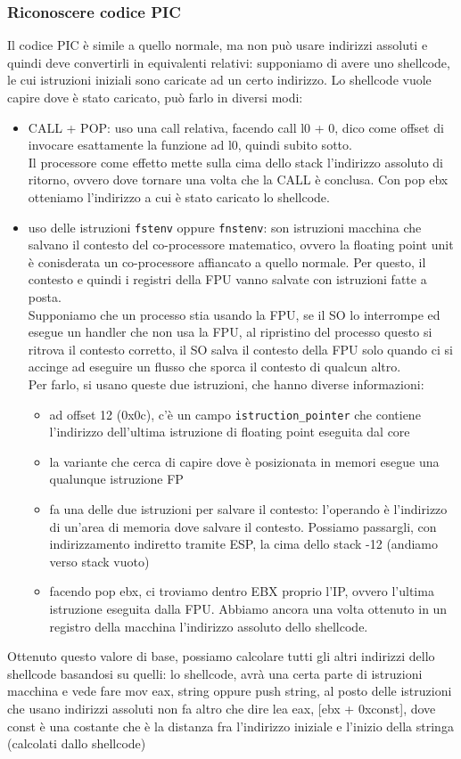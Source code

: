 \documentclass[12pt, oneside]{extbook}
\begin{document}
\subsubsection{Riconoscere codice PIC}
Il codice PIC è simile a quello normale, ma non può usare indirizzi assoluti e quindi deve convertirli in equivalenti relativi: supponiamo di avere uno shellcode, le cui istruzioni iniziali sono caricate ad un certo indirizzo. Lo shellcode vuole capire dove è stato caricato, può farlo in diversi modi:
\begin{itemize}
	\item CALL + POP: uso una call relativa, facendo call l0 + 0, dico come offset di invocare esattamente la funzione ad l0, quindi subito sotto.\\Il processore come effetto mette sulla cima dello stack l'indirizzo assoluto di ritorno, ovvero dove tornare una volta che la CALL è conclusa. Con pop ebx otteniamo l'indirizzo a cui è stato caricato lo shellcode.
	\item uso delle istruzioni \texttt{fstenv} oppure \texttt{fnstenv}: son istruzioni macchina che salvano il contesto del co-processore matematico, ovvero la floating point unit è conisderata un co-processore affiancato a quello normale. Per questo, il contesto e quindi i registri della FPU vanno salvate con istruzioni fatte a posta.\\Supponiamo che un processo stia usando la FPU, se il SO lo interrompe ed esegue un handler che non usa la FPU, al ripristino del processo questo si ritrova il contesto corretto, il SO salva il contesto della FPU solo quando ci si accinge ad eseguire un flusso che sporca il contesto di qualcun altro.\\Per farlo, si usano queste due istruzioni, che hanno diverse informazioni:
	\begin{itemize}
		\item ad offset 12 (0x0c), c'è un campo \texttt{istruction\_pointer} che contiene l'indirizzo dell'ultima istruzione di floating point eseguita dal core
		\item la variante che cerca di capire dove è posizionata in memori esegue una qualunque istruzione FP
		\item fa una delle due istruzioni per salvare il contesto: l'operando è l'indirizzo di un'area di memoria dove salvare il contesto. Possiamo passargli, con indirizzamento indiretto tramite ESP, la cima dello stack -12 (andiamo verso stack vuoto)
		\item facendo pop ebx, ci troviamo dentro EBX proprio l'IP, ovvero l'ultima istruzione eseguita dalla FPU. Abbiamo ancora una volta ottenuto in un registro della macchina l'indirizzo assoluto dello shellcode.
	\end{itemize}
\end{itemize}
Ottenuto questo valore di base, possiamo calcolare tutti gli altri indirizzi dello shellcode basandosi su quelli: lo shellcode, avrà una certa parte di istruzioni macchina e vede fare mov eax, string oppure push string, al posto delle istruzioni che usano indirizzi assoluti non fa altro che dire lea eax, [ebx + 0xconst], dove const è una costante che è la distanza fra l'indirizzo iniziale e l'inizio della stringa (calcolati dallo shellcode)
\end{document}
